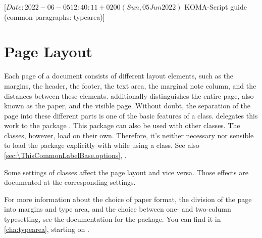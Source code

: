 %
%
%
%
%
%
%

                 [$Date: 2022-06-05 12:40:11 +0200 (Sun, 05 Jun 2022) $
                  KOMA-Script guide (common paragraphs: typearea)]

\section{Page Layout}
\BeginIndexGroup
{}

Each page of a document consists of different layout elements, such as the
margins, the header, the footer, the text area, the marginal note column, and
the distances between these elements. \KOMAScript{} additionally distinguishes
the entire page, also known as the paper, and the visible page. Without doubt,
the separation of the page into these different parts is one of the basic
features of a class.
\KOMAScript{} delegates this work to the package
\hyperref[cha:typearea]{}. This
package can also be used with other classes. The \KOMAScript{} classes,
however, load  on their own. Therefore, it's neither
necessary nor sensible to load the package explicitly with 
while using a \KOMAScript{} class. See also
\autoref{sec:\ThisCommonLabelBase.options},
.

Some settings of \KOMAScript{} classes affect the page layout and vice versa.
Those effects are documented at the corresponding settings.

For more information about the choice of paper format, the division of the
page into margins and type area, and the choice between one- and two-column
typesetting, see the documentation for the
\hyperref[cha:typearea]{}
package. You can find it in \autoref{cha:typearea}, starting on
.

